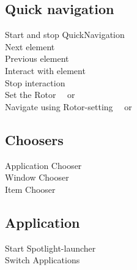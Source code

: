\documentclass[a4paper, landscape, 11pt]{scrartcl}
\newcommand{\command}[2]{#1~\dotfill{}~#2\\} %
\begin{document}
\begin{multicols}{2}
\subsection*{Quick navigation}
\command{Start and stop QuickNavigation}{\keys{\arrowkeyleft + \arrowkeyright}}
\command{Next element}{\keys{\arrowkeyright}}
\command{Previous element}{\keys{\arrowkeyleft}}
\command{Interact with element}{\keys{\arrowkeyright + \arrowkeydown}}
\command{Stop interaction}{\keys{\arrowkeyleft + \arrowkeydown}}
\command{Set the Rotor}{\keys{\arrowkeyleft + \arrowkeyup} or \keys{\arrowkeyright + \arrowkeyup}}
\command{Navigate using Rotor-setting}{\keys{\arrowkeydown} or \keys{\arrowkeyup}}

\subsection*{Choosers}
\command{Application Chooser}{}
\command{Window Chooser}{}
\command{Item Chooser}{}

\subsection*{Application}
\command{Start Spotlight-launcher}{\keys{\cmd + \SPACE}}
\command{Switch Applications}{\keys{\cmd + \tab}}

\end{multicols}

\hrulefill{}
\end{document}
